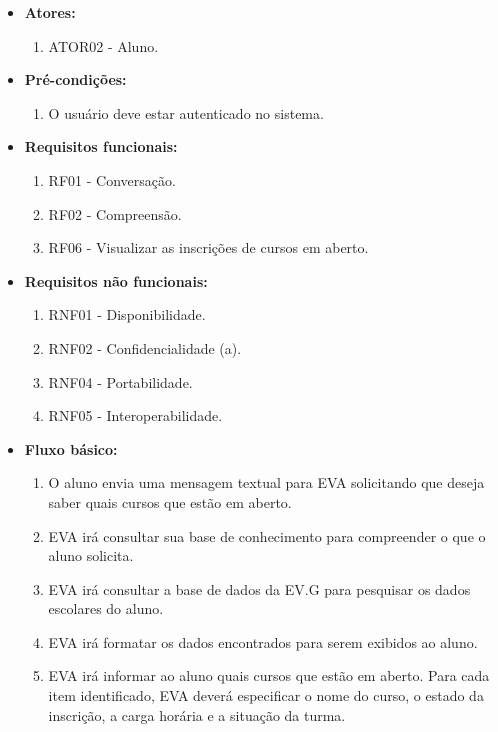\begin{itemize}
    \item \textbf{Atores:}
        \begin{enumerate}
            \item ATOR02 - Aluno.
        \end{enumerate}
    \item \textbf{Pré-condições:}
        \begin{enumerate}
            \item O usuário deve estar autenticado no sistema.
        \end{enumerate}
    \item \textbf{Requisitos funcionais:}
        \begin{enumerate}
            \item RF01 - Conversação.
            \item RF02 - Compreensão.
            \item RF06 - Visualizar as inscrições de cursos em aberto.
        \end{enumerate}
    \item \textbf{Requisitos não funcionais:}
        \begin{enumerate}
            \item RNF01 - Disponibilidade.
            \item RNF02 - Confidencialidade (a).
            \item RNF04 - Portabilidade.
            \item RNF05 - Interoperabilidade.
        \end{enumerate}
    \item \textbf{Fluxo básico:}
        \begin{enumerate}
            \item O aluno envia uma mensagem textual para EVA solicitando que deseja saber quais cursos que estão em aberto.
            \item EVA irá consultar sua base de conhecimento para compreender o que o aluno solicita.
            \item EVA irá consultar a base de dados da EV.G para pesquisar os dados escolares do aluno.
            \item EVA irá formatar os dados encontrados para serem exibidos ao aluno.
            \item EVA irá informar ao aluno quais cursos que estão em aberto. Para cada item identificado, EVA deverá especificar o nome do curso, o estado da inscrição, a carga horária e a situação da turma. 
        \end{enumerate}
        

\end{itemize}
